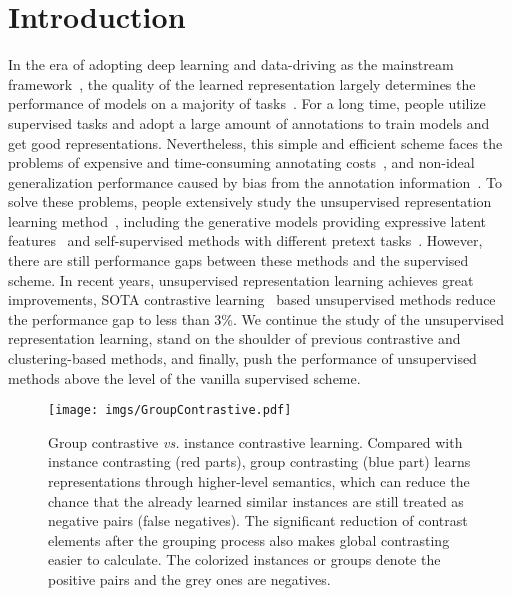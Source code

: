 \documentclass[runningheads]{style/llncs}
\begin{document}
\section{Introduction}
In the era of adopting deep learning and data-driving as the mainstream framework~\cite{lecun2015deep}, the quality of the learned representation largely determines the performance of models on a majority of tasks~\cite{zhou2016learning}. For a long time, people utilize supervised tasks and adopt a large amount of annotations to train models and get good representations. Nevertheless, this simple and efficient scheme faces the problems of expensive and time-consuming annotating costs~\cite{asano2020labelling,fabbri2018learning,fang2019instaboost,sun2022correlation}, and non-ideal generalization performance caused by bias from the annotation information~\cite{ben2007analysis,pan2010domain}. To solve these problems, people extensively study the unsupervised representation learning method~\cite{sun2022human}, including the generative models providing expressive latent features~\cite{kingma2013auto,rezende2014stochastic} and self-supervised methods with different pretext tasks~\cite{vincent2008extracting,vincent2008extracting,pathak2016context,noroozi2016unsupervised}. However, there are still performance gaps between these methods and the supervised scheme. In recent years, unsupervised representation learning achieves great improvements, SOTA contrastive learning~\cite{simclr,moco,swav,byol} based unsupervised methods reduce the performance gap to less than 3\%. We continue the study of the unsupervised representation learning, stand on the shoulder of previous contrastive and clustering-based methods, and finally, push the performance of unsupervised methods above the level of the vanilla supervised scheme.

\begin{wrapfigure}[28]{r}{0.5\linewidth}
	\vspace{-0.32in}
	\texttt{[image: imgs/GroupContrastive.pdf]}
	\caption{Group contrastive \textit{vs.} instance contrastive learning. Compared with instance contrasting (red parts), group contrasting (blue part) learns representations through higher-level semantics, which can reduce the chance that the already learned similar instances are still treated as negative pairs (false negatives). The significant reduction of contrast elements after the grouping process also makes global contrasting easier to calculate. The colorized instances or groups denote the positive pairs and the grey ones are negatives.}
	\label{fig:cover}
\end{wrapfigure}
\end{document}
